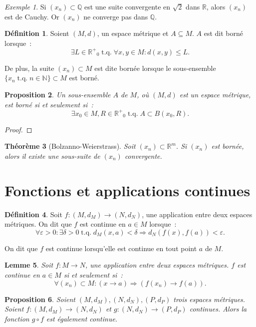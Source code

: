 \documentclass{report}
\newtheorem{thm}{Théorème}[section]
\newtheorem{prp}[thm]{Proposition}
\newtheorem{lem}[thm]{Lemme}
\theoremstyle{definition}
\newtheorem{déf}[thm]{Définition}
\theoremstyle{remark}
\newtheorem{ex}{Exemple}[section]
\DeclareMathOperator{\tq}{\text{ t.q. }}
\newcommand{\R}{\mathbb R}
\newcommand{\Rp}{{\R^+}}
\newcommand{\Q}{\mathbb Q}
\newcommand{\N}{\mathbb N}
\begin{document}
		\begin{ex} Si $(x_n) \subset \Q$ est une suite convergente en $\sqrt 2$ dans $\R$, alors $(x_n)$ est de Cauchy. Or $(x_n)$ ne converge pas dans $\Q$.
		\end{ex}

		\begin{déf} Soient $(M, d)$, un espace métrique et $A \subseteq M$. $A$ est dit borné lorsque~:
		\[\exists L \in \Rp_0 \tq \forall x, y \in M : d(x, y) \leq L.\]

		De plus, la suite $(x_n) \subset M$ est dite bornée lorsque le sous-ensemble $\{x_n \tq n \in \N\} \subset M$ est borné.
		\end{déf}

		\begin{prp} Un sous-ensemble $A$ de $M$, où $(M, d)$ est un espace métrique, est borné si et seulement si~:
		\[\exists x_0 \in M, R \in \Rp_0 \tq A \subset B(x_0, R).\]
		\end{prp}

		\begin{proof}  %
		\end{proof}

		\begin{thm}[Bolzanno-Weierstrass] Soit $(x_n) \subset \R^m$. Si $(x_n)$ est bornée, alors il existe une sous-suite de $(x_n)$ convergente.
		\end{thm}
	
	\section{Fonctions et applications continues}
		\begin{déf} Soit $f : (M, d_M) \to (N, d_N)$, une application entre deux espaces métriques. On dit que $f$ est continue en $a \in M$ lorsque~:
		\[\forall \varepsilon > 0 : \exists \delta > 0 \tq d_M(x, a) < \delta \Rightarrow d_N(f(x), f(a)) < \varepsilon.\]

		On dit que $f$ est continue lorsqu'elle est continue en tout point $a$ de $M$.
		\end{déf}

		\begin{lem} Soit $f : M \to N$, une application entre deux espaces métriques. $f$ est continue en $a \in M$ si et seulement si~:
		\[\forall (x_n) \subset M : \left(x \to a\right) \Rightarrow \left(f(x_n) \to f(a)\right).\]
		\end{lem}

		\begin{prp} Soient $(M, d_M), (N, d_N), (P, d_P)$ trois espaces métriques. Soient $f : (M, d_M) \to (N, d_N)$ et $g : (N, d_N) \to (P, d_P)$ continues.
		Alors la fonction $g \circ f$ est également continue.
		\end{prp}
\end{document}
